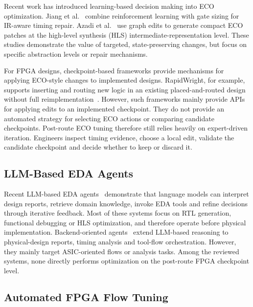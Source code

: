 \documentclass[conference]{IEEEtran}
\begin{document}
Recent work has introduced learning-based decision making into ECO
optimization. Jiang et al.~\cite{jiang_ir_aware_eco_2024} combine
reinforcement
learning with gate sizing for IR-aware timing repair.
Azadi et al.~\cite{azadi_graph_based_eco_2026} use graph edits to
generate compact ECO patches at the high-level synthesis (HLS)
intermediate-representation level. These studies demonstrate the value
of targeted, state-preserving changes, but focus on specific
abstraction levels or repair mechanisms.

For FPGA designs, checkpoint-based frameworks provide mechanisms for
applying ECO-style changes to implemented designs. RapidWright, for
example, supports inserting and routing new logic in an existing
placed-and-routed design without full
reimplementation~\cite{rapidwright_eco_tutorial_2025}. However, such frameworks mainly provide APIs for
applying edits to an implemented checkpoint.
They do not provide an automated strategy for selecting
ECO actions or comparing candidate checkpoints.
Post-route ECO tuning therefore still relies heavily on
expert-driven iteration. Engineers inspect timing
evidence, choose a local edit, validate the candidate checkpoint and
decide whether to keep or discard it.

\subsection{LLM-Based EDA Agents}
\label{sec:llm-based-eda-agents}

Recent LLM-based EDA agents~\cite{pan_survey_llm_eda_2025,
liu_chipnemo_2023,thakur_autochip_2023,ho_verilogcoder_2025,
mashnoor_timelyhls_2025,moraru_laafd_2026} demonstrate that language
models can interpret design reports, retrieve domain knowledge, invoke
EDA tools and refine decisions through iterative feedback. Most of
these systems focus on RTL generation, functional debugging or HLS
optimization, and therefore operate before physical implementation.
Backend-oriented agents~\cite{ghose_orfs_agent_2025,
ouyang_retrieve_schedule_reflect_2026,
nainani_timing_analysis_agent_2025} extend LLM-based reasoning to
physical-design reports, timing analysis and tool-flow orchestration.
However, they mainly target ASIC-oriented flows or analysis tasks.
Among the reviewed systems, none directly performs optimization on the post-route FPGA checkpoint level. 

\subsection{Automated FPGA Flow Tuning}
\label{sec:automated-fpga-flow-tuning}
\end{document}

